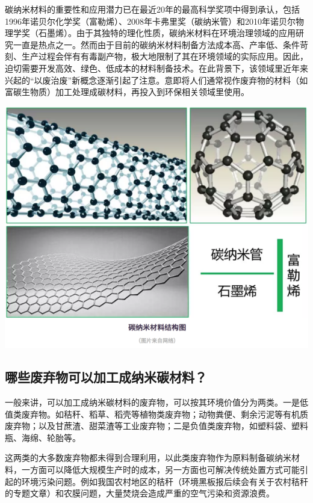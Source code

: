\documentclass[]{book}
\begin{document}
碳纳米材料的重要性和应用潜力已在最近20年的最高科学奖项中得到承认，包括1996年诺贝尔化学奖（富勒烯）、2008年卡弗里奖（碳纳米管）和2010年诺贝尔物理学奖（石墨烯）。由于其独特的理化性质，碳纳米材料在环境治理领域的应用研究一直是热点之一。然而由于目前的碳纳米材料制备方法成本高、产率低、条件苛刻、生产过程会伴有有毒副产物，极大地限制了其在环境领域的实际应用。因此，迫切需要开发高效、绿色、低成本的材料制备技术。在此背景下，该领域里近年来兴起的``以废治废''新概念逐渐引起了注意。意即将人们通常视作废弃物的材料（如富碳生物质）加工处理成碳材料，再投入到环保相关领域里使用。

\includegraphics[width=8.33in]{images/nano1}

\hypertarget{ux54eaux4e9bux5e9fux5f03ux7269ux53efux4ee5ux52a0ux5de5ux6210ux7eb3ux7c73ux78b3ux6750ux6599}{%
\subsection{哪些废弃物可以加工成纳米碳材料？}\label{ux54eaux4e9bux5e9fux5f03ux7269ux53efux4ee5ux52a0ux5de5ux6210ux7eb3ux7c73ux78b3ux6750ux6599}}

一般来讲，可以加工成纳米碳材料的废弃物，可以按其环境价值分为两类。一是低值类废弃物。如秸秆、稻草、稻壳等植物类废弃物；动物粪便、剩余污泥等有机质废弃物；以及甘蔗渣、甜菜渣等工业废弃物；二是负值类废弃物，如塑料袋、塑料瓶、海绵、轮胎等。

这两类的大多数废弃物都未得到合理利用，以此类废弃物作为原料制备碳纳米材料，一方面可以降低大规模生产时的成本，另一方面也可解决传统处置方式可能引起的环境污染问题。例如我国农村地区的秸秆（环境黑板报后续会有关于农村秸秆的专题文章）和农膜问题，大量焚烧会造成严重的空气污染和资源浪费。
\end{document}
